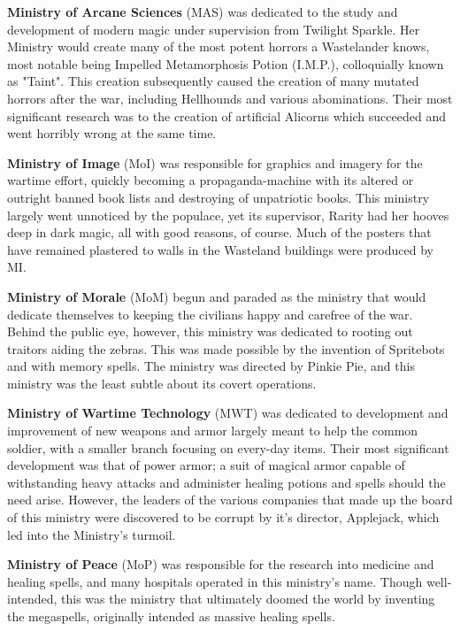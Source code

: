 \documentclass[11pt,a4paper,twocolumn]{book}
\begin{document}
    \textbf{Ministry of Arcane Sciences} (MAS) was dedicated to the study and development of modern magic under supervision from Twilight Sparkle. Her Ministry would create many of the most potent horrors a Wastelander knows, most notable being Impelled Metamorphosis Potion (I.M.P.), colloquially known as "Taint". This creation subsequently caused the creation of many mutated horrors after the war, including Hellhounds and various abominations. Their most significant research was to the creation of artificial Alicorns which succeeded and went horribly wrong at the same time.
    
    \bigskip
    
    \textbf{Ministry of Image} (MoI) was responsible for graphics and imagery for the wartime effort, quickly becoming a propaganda-machine with its altered or outright banned book lists and destroying of unpatriotic books. This ministry largely went unnoticed by the populace, yet its supervisor, Rarity had her hooves deep in dark magic, all with good reasons, of course. Much of the posters that have remained plastered to walls in the Wasteland buildings were produced by MI.
    
    \bigskip
    
    \textbf{Ministry of Morale} (MoM) begun and paraded as the ministry that would dedicate themselves to keeping the civilians happy and carefree of the war. Behind the public eye, however, this ministry was dedicated to rooting out traitors aiding the zebras. This was made possible by the invention of Spritebots and with memory spells. The ministry was directed by Pinkie Pie, and this ministry was the least subtle about its covert operations. 
    
    \bigskip
    
    \textbf{Ministry of Wartime Technology} (MWT) was dedicated to development and improvement of new weapons and armor largely meant to help the common soldier, with a smaller branch focusing on every-day items. Their most significant development was that of power armor; a suit of magical armor capable of withstanding heavy attacks and administer healing potions and spells should the need arise. 
    However, the leaders of the various companies that made up the board of this ministry were discovered to be corrupt by it's director, Applejack, which led into the Ministry's turmoil.
    
    \bigskip
    
    \textbf{Ministry of Peace} (MoP) was responsible for the research into medicine and healing spells, and many hospitals operated in this ministry's name. Though well-intended, this was the ministry that ultimately doomed the world by inventing the megaspells, originally intended as massive healing spells.
    
\end{document}

